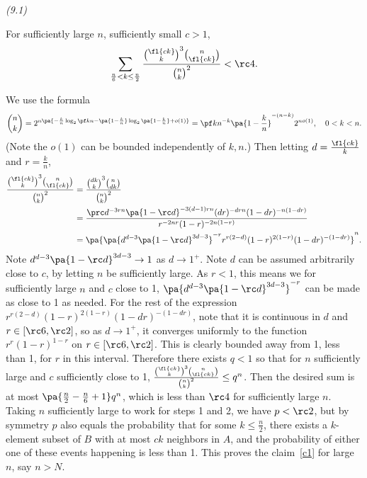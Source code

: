 \begin{problem}{\it(9.1)}
\begin{st}
For sufficiently large $n$, sufficiently small $c>1$,
\[
\sum_{\frac n6< k\le \frac n2} \frac{\binom{\fl{ck}}{k}^3\binom{n}{\fl{ck}}}{\binom nk^2}< \rc 4.
\]
\end{st}
We use the formula
\[
\binom{n}{k}=2^{n\pa{-\frac kn \log_2 \pf kn-\pa{1-\frac kn}\log_2\pa{1-\frac kn}+o(1)}}=\pf kn^{-k}\pa{1-\frac kn}^{-(n-k)}2^{no(1)},\quad 0<k<n.
\]
(Note the $o(1)$ can be bounded independently of $k,n$.) Then letting $d=\frac{\fl{ck}}{k}$ and $r=\frac{k}{n}$,
\begin{align*}
\frac{\binom{\fl{ck}}{k}^3\binom{n}{\fl{ck}}}{\binom nk^2}
&=\frac{\binom{dk}{k}^3\binom{n}{dk}}{\binom nk^2}\\
&=\frac{\prc d^{-3rn}\pa{1-\rc d}^{-3(d-1)rn} (dr)^{-drn} (1-dr)^{-n(1-dr)}}{r^{-2nr}(1-r)^{-2n(1-r)}}\\
&=\pa{\pa{d^{d-3}\pa{1-\rc d}^{3d-3}}^{-r}r^{r(2-d)}(1-r)^{2(1-r)}(1-dr)^{-(1-dr)}}^{n}.
\end{align*}
Note $d^{d-3}\pa{1-\rc d}^{3d-3}\to 1$ as $d\to 1^+$. Note $d$ can be assumed arbitrarily close to $c$, by letting $n$ be sufficiently large. As $r<1$, this means we for sufficiently large $n$ and $c$ close to 1,
$\pa{d^{d-3}\pa{1-\rc d}^{3d-3}}^{-r}$ can be made as close to 1 as needed. For the rest of the expression $r^{r(2-d)}(1-r)^{2(1-r)}(1-dr)^{-(1-dr)}$, note that it is continuous in $d$ and $r\in [\rc 6,\rc 2]$, so as $d\to 1^+$, it converges uniformly to the function $r^{r}(1-r)^{1-r}$ on $r\in [\rc 6,\rc 2]$. This is clearly bounded away from 1, less than 1, for $r$ in this interval. Therefore there exists $q<1$ so that for $n$ sufficiently large and $c$ sufficiently close to 1, $\frac{\binom{\fl{ck}}{k}^3\binom{n}{\fl{ck}}}{\binom nk^2}\le q^n$. Then the desired sum is at most $\pa{\frac{n}{2}-\frac{n}{6}+1}q^n$, which is less than $\rc 4$ for sufficiently large $n$.\\

Taking $n$ sufficiently large to work for steps 1 and 2, we have $p<\rc2$, but by symmetry $p$ also equals the probability that for some $k\le \frac n2$, there exists a $k$-element subset of $B$ with at most $ck$ neighbors in $A$, and the probability of either one of these events happening is less than 1. This proves the claim~\ref{c1} for large $n$, say $n> N$.\\ %


\end{problem}
